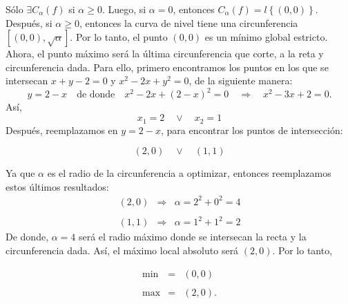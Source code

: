 \begin{enumerate}
	Sólo $\exists C_\alpha(f)$ si $\alpha\geq 0$. Luego, si $\alpha=0$, entonces $C_{\alpha}(f)=l\left\{ (0,0) \right\}$. Después, si $\alpha\geq 0$, entonces la curva de nivel tiene una circunferencia $\left[(0,0),\sqrt{\alpha}\right]$. Por lo tanto, el punto $(0,0)$ es un mínimo global estricto.\\
	Ahora, el punto máximo será la última circunferencia que corte, a la reta y circunferencia dada. Para ello, primero encontramos los puntos en los que se intersecan $x+y-2=0$ y $x^2-2x+y^2=0$, de la siguiente manera:
	$$y=2-x \quad\mbox{de donde}\quad x^2-2x+(2-x)^2=0\quad \Rightarrow \quad x^2-3x+2=0.$$
	Así,
	    $$x_1=2\quad \lor \quad x_2=1$$
	Después, reemplazamos en $y=2-x$, para encontrar los puntos de intersección:
	\begin{tcolorbox}
	    $$(2,0)\quad \lor \quad (1,1)$$
	\end{tcolorbox}

	Ya que $\alpha$ es el radio de la circunferencia a optimizar, entonces reemplazamos estos últimos resultados:
	$$
	\begin{array}{rcl}
	    (2,0) & \Rightarrow & \alpha=2^2+0^2=4\\\\
	    (1,1) & \Rightarrow & \alpha=1^2+1^2=2
	\end{array}
	$$
	De donde, $\alpha=4$ será el radio máximo donde se intersecan la recta y la circunferencia dada. Así, el máximo local absoluto será $(2,0)$. Por lo tanto, 
	\begin{tcolorbox}
	    $$
	    \begin{array}{rcl}
		\min &=& (0,0)\\\\
		\max &=& (2,0).
	    \end{array}
	    $$
	\end{tcolorbox}

\end{enumerate}




